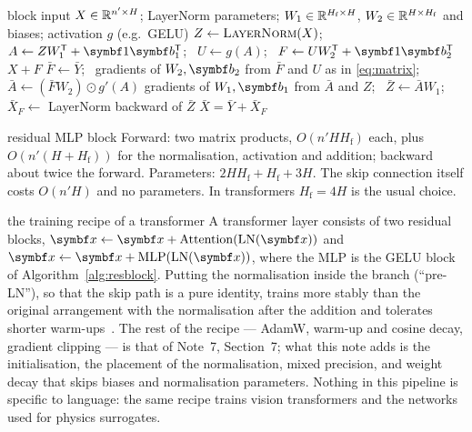 \documentclass[11pt]{article}
\newcommand{\bv}{\vect{b}}
\newcommand{\onev}{\vect{1}}
\begin{document}
\begin{algorithm}[H]
\caption{A pre-normalisation residual MLP block (forward and backward)}\label{alg:resblock}
\begin{algorithmic}[1]
\Require block input $X \in \mathbb{R}^{n' \times H}$; LayerNorm parameters; $W_1 \in \mathbb{R}^{H_{\mathrm{f}} \times H}$, $W_2 \in
  \mathbb{R}^{H \times H_{\mathrm{f}}}$ and biases; activation $g$ (e.g.\ GELU)
  \State $Z \gets \Call{LayerNorm}{X}$; \ $A \gets ZW_1\T + \onev\bv_1\T$; \ $U \gets g(A)$; \ $F \gets UW_2\T + \onev\bv_2\T$
  \State \Return $X + F$ 
\EndFunction
{} 
  \State $\bar{F} \gets \bar{Y}$; \ gradients of $W_2, \bv_2$ from $\bar{F}$ and $U$ as in \eqref{eq:matrix}; \ $\bar{A} \gets (\bar{F} W_2) \odot g'(A)$
  \State gradients of $W_1, \bv_1$ from $\bar{A}$ and $Z$; \ $\bar{Z} \gets \bar{A} W_1$; \ $\bar{X}_F \gets$ LayerNorm backward of $\bar{Z}$
  \State \Return $\bar{X} = \bar{Y} + \bar{X}_F$ 
\EndFunction
\end{algorithmic}
\end{algorithm}

\begin{runtime}{residual MLP block}
Forward: two matrix products, $O(n'HH_{\mathrm{f}})$ each, plus $O(n'(H + H_{\mathrm{f}}))$ for the normalisation, activation
and addition; backward about twice the forward. Parameters: $2HH_{\mathrm{f}} + H_{\mathrm{f}} + 3H$. The skip connection
itself costs $O(n'H)$ and no parameters. In transformers $H_{\mathrm{f}} = 4H$ is the usual choice.
\end{runtime}

\begin{modern}{the training recipe of a transformer}
A transformer layer consists of two residual blocks, $\x \gets \x + \mathrm{Attention}(\mathrm{LN}(\x))$ and
$\x \gets \x + \mathrm{MLP}(\mathrm{LN}(\x))$, where the MLP is the GELU block of Algorithm~\ref{alg:resblock}. Putting the
normalisation inside the branch (``pre-LN''), so that the skip path is a pure identity, trains more stably than the
original arrangement with the normalisation after the addition and tolerates shorter warm-ups~\cite{xiong2020}. The
rest of the recipe --- AdamW, warm-up and cosine decay, gradient clipping --- is that of Note~7, Section~7; what this
note adds is the initialisation, the placement of the normalisation, mixed precision, and weight decay that skips biases
and normalisation parameters. Nothing in this pipeline is specific to language: the same recipe trains vision
transformers and the networks used for physics surrogates.
\end{modern}
\end{document}
